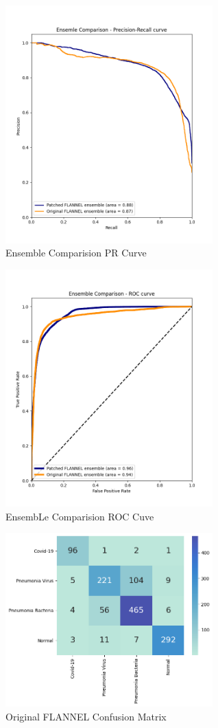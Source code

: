 \documentclass{sigkddExp}
\begin{document}
\begin{figure}
    \centering

    \centering
    \includegraphics[width=8cm]{../doc/images/ensemble_comparison_precision_recall_curve.png}
    \caption{Ensemble Comparision PR Curve}
    \label{fig:ec_prcurve}
\end{figure}


\begin{figure}
    \centering
    \includegraphics[width=8cm]{../doc/images/ensemble_comparison_roc_curve.png}
    \caption{EnsembLe Comparision ROC Cuve}
    \label{fig:ec_roccurve}
\end{figure}


\begin{figure}
    \centering
    \includegraphics[width=8cm]{../doc/images/base_flannel_cf.png}
    \caption{Original FLANNEL Confusion Matrix}
    \label{fig:f_cf}
\end{figure}
\end{document}
